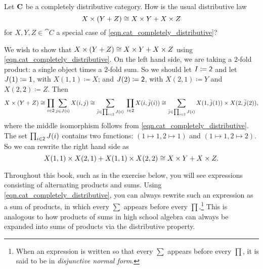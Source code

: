 \documentclass[Book-Poly]{subfiles}
\begin{document}
\begin{exercise}
    Let $\mathbf{C}$ be a completely distributive category.
    How is the usual distributive law
    \[
    X\times(Y+Z)\cong X\times Y+X\times Z
    \]
    for $X,Y,Z\in\cat{C}$ a special case of \eqref{eqn.cat_completely_distributive}?
    \begin{solution}
        We wish to show that $X\times (Y+Z)\cong X\times Y+X\times Z$ using \eqref{eqn.cat_completely_distributive}.
        On the left hand side, we are taking a $2$-fold product: a single object times a $2$-fold sum.
        So we should let $I\coloneqq\textsf{2}$ and let $J(1)\coloneqq\textsf{1}$, with $X(1,1)\coloneqq X$; and $J(2)\coloneqq\textsf{2}$, with $X(2,1)\coloneqq Y$ and $X(2,2)\coloneqq Z$.
        Then
        \[
        X\times(Y+Z)\cong \prod_{i\in\textsf{2}}\sum_{j\in J(i)}X(i,j) \cong \sum_{\bar{j}\in\prod_{i\in\textsf{2}}J(i)}\;\prod_{i\in \textsf{2}}X(i,\bar{j}(i)) \cong \sum_{\bar{j}\in\prod_{i\in\textsf{2}}J(i)}X(1,\bar{j}(1))\times X(2,\bar{j}(2)),
        \]
        where the middle isomorphism follows from \eqref{eqn.cat_completely_distributive}.
        The set $\prod_{i\in\textsf{2}}J(i)$ contains two functions: $(1\mapsto1,2\mapsto1)$ and $(1\mapsto1,2\mapsto2)$.
        So we can rewrite the right hand side as
        \[
        X(1,1)\times X(2,1)+X(1,1)\times X(2,2)\cong X\times Y+X\times Z.
        \]
    \end{solution}
\end{exercise}

Throughout this book, such as in the exercise below, you will see expressions consisting of alternating products and sums.
Using \eqref{eqn.cat_completely_distributive}, you can always rewrite such an expression as a sum of products, in which every $\sum$ appears before every $\prod$.\footnote{When an expression is written so that every $\sum$ appears before every $\prod$, it is said to be in \emph{disjunctive normal form}.}
This is analogous to how products of sums in high school algebra can always be expanded into sums of products via the distributive property.

\end{document}
